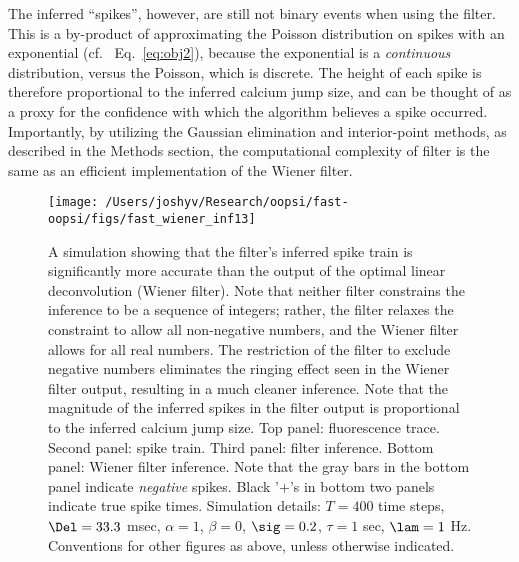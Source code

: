 The inferred ``spikes'', however, are still not binary events when using the \foopsi filter.  This is a by-product of approximating the Poisson distribution on spikes with an exponential (cf.~ Eq.~\eqref{eq:obj2}), because the exponential is a \emph{continuous} distribution, versus the Poisson, which is discrete.  The height of each spike is therefore proportional to the inferred calcium jump size, and can be thought of as a proxy for the confidence with which the algorithm believes a spike occurred.   Importantly, by utilizing the Gaussian elimination and interior-point methods, as described in the Methods section, the computational complexity of \foopsi filter is the same as an efficient implementation of the Wiener filter.  




\begin{figure}[h!]
\centering \texttt{[image: /Users/joshyv/Research/oopsi/fast-oopsi/figs/fast\_wiener\_inf13]}
\caption[\foopsi filter outperforms Wiener filter]{A simulation showing that the \foopsi filter's inferred spike train is significantly more accurate than the output of the optimal linear deconvolution (Wiener filter). Note that neither filter constrains the inference to be a sequence of integers; rather, the \foopsi filter relaxes the constraint to allow all non-negative numbers, and the Wiener filter allows for all real numbers.  The restriction of the \foopsi filter to exclude negative numbers eliminates the ringing effect seen in the Wiener filter output, resulting in a much cleaner inference.  Note that the magnitude of the inferred spikes in the \foopsi filter output is proportional to the inferred calcium jump size.  Top panel: fluorescence trace.  Second panel: spike train.  Third panel: \foopsi filter inference.  Bottom panel: Wiener filter inference.  Note that the gray bars in the bottom panel indicate \emph{negative} spikes. Black '$+$'s in bottom two panels indicate true spike times.  Simulation details: $T= 400$ time steps, $\Del=33.3$ msec, $\alpha=1$, $\beta=0$, $\sig=0.2$, $\tau=1$ sec, $\lam=1$ Hz. Conventions for other figures as above, unless otherwise indicated.} \label{fig:woopsi_inf}
\end{figure}

